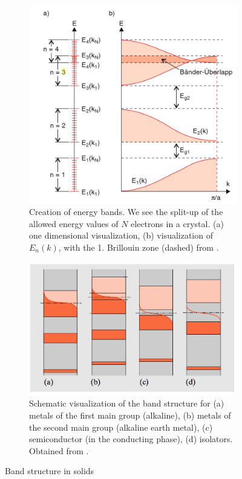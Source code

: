 \begin{figure}
    \centering
    \begin{subfigure}[b]{\picwidththeo}
        \includegraphics[width=\textwidth]{figures/baender1}
        \caption{ Creation of energy bands. We see the split-up of the
            allowed energy values of $N$ electrons in a crystal.
            (a) one dimensional visualization,
            (b) visualization of $E_n(k)$, with the 1. Brillouin zone (dashed) from
            \cite{demtroder2000experimentalphysik}.
            }
        \label{fig:baender1}
    \end{subfigure}\qquad
    \begin{subfigure}[b]{\picwidththeo}
        \includegraphics[width=\textwidth]{figures/baender2}
        \caption{Schematic visualization of the band structure for
            (a) metals of the first main group (alkaline),
            (b) metals of the second main group  (alkaline earth metal), 
            (c) semiconductor (in the conducting phase),
            (d) isolators.
            Obtained from \cite{vogel1997gerthsen}.}
        \label{fig:baender2}
    \end{subfigure}
    \caption{Band structure in solids}
    \label{fig:baender}
\end{figure}
